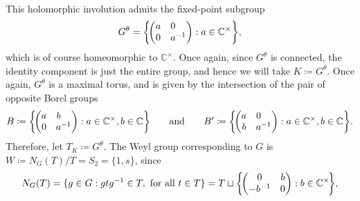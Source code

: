 \begin{example}
\begin{align*}
\begin{split}
\end{split}
\end{align*}
\noindent This holomorphic involution admits the fixed-point subgroup
\begin{align*}
\begin{split}
G^\theta = \left\{\!\begin{pmatrix}a&0\hphantom{{}^{-1}}\\0&a^{-1}\end{pmatrix} : a \in \mathbb{C}^\times\right\}\!,
\end{split}
\end{align*}
\noindent which is of course homeomorphic to $\mathbb{C}^\times$. Once again, since $G^\theta$ is connected, the identity component is just the entire group, and hence we will take $K \coloneqq G^\theta$. Once again, $G^\theta$ is a maximal torus, and is given by the intersection of the pair of opposite Borel groups
\begin{align*}
\begin{split}
B \coloneqq \left\{\!\begin{pmatrix}a&b\hphantom{{}^{-1}}\\0&a^{-1}\end{pmatrix} : a \in \mathbb{C}^\times, b \in \mathbb{C}\right\}\!\qquad\text{and}\qquad B' \coloneqq \left\{\!\begin{pmatrix}a&0\hphantom{{}^{-1}}\\b&a^{-1}\end{pmatrix} : a \in \mathbb{C}^\times, b \in \mathbb{C}\right\}\!.
\end{split}
\end{align*}
\noindent Therefore, let $T_K \coloneqq G^\theta$. The Weyl group corresponding to $G$ is $W \coloneqq N_G(T)/T = S_2 = \{1, s\}$, since
\begin{align*}
\begin{split}
N_G(T) = \{g \in G : gtg^{-1} \in T,\ \textup{for all $t \in T$}\} = T \sqcup \left\{\!\begin{pmatrix}0&b\\-b^{-1}&0\end{pmatrix} : b \in \mathbb{C}^\times\!\right\}\!,
\end{split}
\end{align*}
\noindent %

\end{example}
